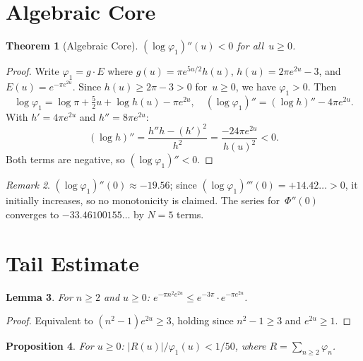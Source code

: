 \documentclass[11pt]{article}
\newtheorem{theorem}{Theorem}
\newtheorem{lemma}[theorem]{Lemma}
\newtheorem{proposition}[theorem]{Proposition}
\theoremstyle{definition}
\theoremstyle{remark}
\newtheorem{remark}[theorem]{Remark}
\begin{document}
\section{Algebraic Core}
\label{sec:algebraic}

\begin{theorem}[Algebraic Core]\label{thm:algebraic}
$(\log\varphi_1)''(u) < 0$ for all~$u \geq 0$.
\end{theorem}

\begin{proof}
Write $\varphi_1 = g \cdot E$ where $g(u) = \pi e^{5u/2}h(u)$,
$h(u) = 2\pi e^{2u} - 3$, and $E(u) = e^{-\pi e^{2u}}$.
Since $h(u) \geq 2\pi - 3 > 0$ for~$u \geq 0$, we have $\varphi_1 > 0$. Then
\[
\log\varphi_1 = \log\pi + \tfrac{5}{2}u + \log h(u) - \pi e^{2u},
\quad
(\log\varphi_1)'' = (\log h)'' - 4\pi e^{2u}.
\]
With $h' = 4\pi e^{2u}$ and $h'' = 8\pi e^{2u}$:
\[
(\log h)'' = \frac{h''h - (h')^2}{h^2} = \frac{-24\pi e^{2u}}{h(u)^2} < 0.
\]
Both terms are negative, so $(\log\varphi_1)'' < 0$.
\end{proof}

\begin{remark}
$(\log\varphi_1)''(0) \approx -19.56$; since
$(\log\varphi_1)'''(0) = +14.42\ldots > 0$, it initially increases, so no
monotonicity is claimed.
The series for~$\Phi''(0)$ converges to $-33.46100155\ldots$ by $N = 5$ terms.
\end{remark}

\section{Tail Estimate}
\label{sec:tail}

\begin{lemma}\label{lem:tail_decay}
For $n \geq 2$ and $u \geq 0$: $e^{-\pi n^2 e^{2u}} \leq e^{-3\pi}\cdot e^{-\pi e^{2u}}$.
\end{lemma}

\begin{proof}
Equivalent to $(n^2 - 1)e^{2u} \geq 3$, holding since $n^2 - 1 \geq 3$ and $e^{2u} \geq 1$.
\end{proof}

\begin{proposition}\label{prop:tail_ratio}
For $u \geq 0$: $|R(u)|/\varphi_1(u) < 1/50$, where $R = \sum_{n\geq 2}\varphi_n$.
\end{proposition}
\end{document}
